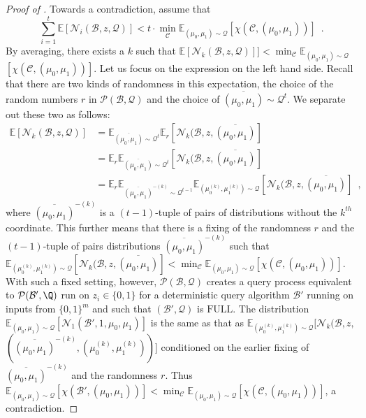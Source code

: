 \documentclass{toc}
\newcommand{\full}{\text{FULL}}
\newcommand{\clB}{\mathcal{B}}
\newcommand{\clC}{\mathcal{C}}
\newcommand{\clQ}{\mathcal{Q}}
\newcommand{\clP}{\mathcal{P}}
\newcommand{\clN}{\mathcal{N}}
\newcommand{\E}{\mathbb{E}}
\begin{document}
\begin{proof}[Proof of {}]
Towards a contradiction, assume that 
\begin{equation}
\sum_{i=1}^t \E[\clN_i(\clB, z,\clQ)] < t \cdot \min_{\clC} \E_{(\mu_0,\mu_1) \sim \clQ} [\chi(\clC, (\mu_0,\mu_1))] \enspace .
\label{hyp}
\end{equation}
By averaging, there exists a $k$ such that $\E[\clN_k(\clB, z, \clQ)]] < \min_{\clC}\E_{(\mu_0,\mu_1)\sim \clQ}$\\$[\chi(\clC, (\mu_0,\mu_1))]$. 
Let us focus on the expression on the left hand side.  Recall that there are two kinds of randomness in this expectation, the choice of the 
random numbers $r$ in $\clP(\clB, \clQ)$ and the choice of $\overline{(\mu_0, \mu_1)} \sim \clQ^t$.  We separate out these two as follows:
\begin{align*}
\E[\clN_k(\clB, z, \clQ)] &= \E_{\overline{(\mu_0, \mu_1)} \sim \clQ^t} \E_r[\clN_k(\clB, z, \overline{(\mu_0, \mu_1)}] \\
&= \E_r \E_{\overline{(\mu_0, \mu_1)} \sim \clQ^t} [\clN_k(\clB, z, \overline{(\mu_0, \mu_1)}] \\
&=\E_r \E_{\overline{(\mu_0, \mu_1)}^{-(k)} \sim \clQ^{t-1}} \E_{(\mu_0^{(k)}, \mu_1^{(k)}) \sim \clQ} [\clN_k(\clB, z, \overline{(\mu_0, \mu_1)}] \enspace,
\end{align*}
where $\overline{(\mu_0, \mu_1)}^{-(k)}$ is a $(t-1)$-tuple of pairs of distributions without the $k^{th}$ coordinate.  This further means that there is a fixing of the randomness $r$ and 
the $(t-1)$-tuple of pairs distributions $\overline{(\mu_0, \mu_1)}^{-(k)}$ such that 
$\E_{(\mu_0^{(k)}, \mu_1^{(k)}) \sim \clQ} [\clN_k(\clB, z, \overline{(\mu_0, \mu_1)}] < \min_{\clC} \E_{(\mu_0,\mu_1) \sim \clQ} [\chi(\clC, (\mu_0,\mu_1))]$.
With such a fixed setting, however,  $\clP(\clB, \clQ)$ creates a query process equivalent to $\clP(\clB',\Q)$ run on $z_i \in \{0,1\}$ for a deterministic query algorithm $\clB'$ running on inputs from $\{0,1\}^m$ and 
such that $(\clB', \clQ)$ is $\full$.  The distribution $\E_{(\mu_0, \mu_1) \sim \clQ}[\clN_1(\clB',1, \mu_0,\mu_1)]$ is the same as that as 
$\E_{(\mu_0^{(k)}, \mu_1^{(k)}) \sim \clQ}[\clN_k(\clB, z,$\\$ (\overline{(\mu_0, \mu_1)}^{-(k)}, (\mu_0^{(k)}, \mu_1^{(k)}))]$
conditioned on the earlier fixing of $\overline{(\mu_0, \mu_1)}^{-(k)}$ and the randomness $r$.  Thus $\E_{(\mu_0, \mu_1) \sim \clQ} [\chi(\clB', (\mu_0, \mu_1))] < \min_{\clC}\E_{(\mu_0,\mu_1)\sim \clQ} [\chi(\clC, (\mu_0,\mu_1))]$, a contradiction.
\end{proof}
\end{document}
